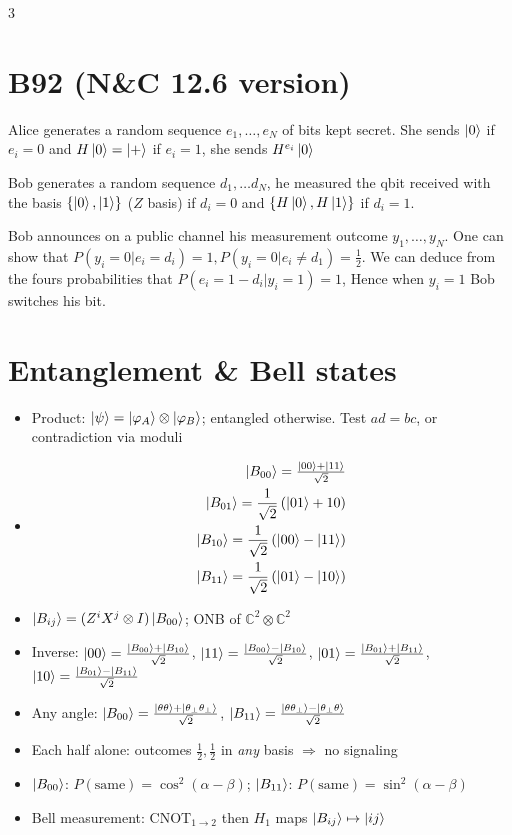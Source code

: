 \documentclass[10pt]{article}
\newcommand{\B}[1]{\ket{B_{#1}}}
\begin{document}
\begin{multicols*}{3}
\section{B92 (N\&C 12.6 version)}
Alice generates a random sequence $e_1, \ldots, e_N$ of bits kept secret. She sends $\ket{0}$ if $e_i = 0$ and $H\ket{0} = \ket{+}$ if $e_i = 1$, she sends $H^{e_i}\ket{0}$

Bob generates a random sequence $d_1, \ldots d_N$, he measured the qbit received with the basis $\left\{\ket{0}, \ket{1}\right\}$ ($Z$ basis) if $d_i = 0$ and $\left\{H\ket{0}, H\ket{1}\right\}$ if $d_i = 1$.

Bob announces on a public channel his measurement outcome $y_1, \ldots, y_N$. One can show that $P\left(y_i = 0| e_i = d_i\right) = 1, P\left(y_i = 0| e_i \neq d_1\right) = \frac{1}{2}$. We can deduce from the fours probabilities that $P\left(e_i = 1 - d_i| y_i = 1\right) = 1$, Hence when $y_i = 1$ Bob switches his bit.

\section{Entanglement \& Bell states}
\begin{itemize}
  \item Product: $\ket\psi=\ket{\varphi_A}\otimes\ket{\varphi_B}$; entangled otherwise. Test $ad=bc$, or contradiction via moduli
  \item 
  \begin{align*} 
 \ket{B_{00}}=\tfrac{\ket{00}+\ket{11}}{\sqrt2}\\
\ket{B_{01}} = \frac{1}{\sqrt{2}}\left(\ket{01} + 10\right)\\
\ket{B_{10}} = \frac{1}{\sqrt{2}}\left(\ket{00} - \ket{11}\right)\\
\ket{B_{11}} = \frac{1}{\sqrt{2}} \left(\ket{01}-\ket{10}\right)
  \end{align*}
  \item $\B{ij}=(Z^iX^j\otimes I)\B{00}$; ONB of $\mathbb C^2\otimes\mathbb C^2$
  \item Inverse: $\ket{00}=\tfrac{\B{00}+\B{10}}{\sqrt2}$, $\ket{11}=\tfrac{\B{00}-\B{10}}{\sqrt2}$, $\ket{01}=\tfrac{\B{01}+\B{11}}{\sqrt2}$, $\ket{10}=\tfrac{\B{01}-\B{11}}{\sqrt2}$
  \item Any angle: $\B{00}=\tfrac{\ket{\theta\theta}+\ket{\theta_\perp\theta_\perp}}{\sqrt2}$, $\B{11}=\tfrac{\ket{\theta\theta_\perp}-\ket{\theta_\perp\theta}}{\sqrt2}$
  \item Each half alone: outcomes $\tfrac12,\tfrac12$ in \emph{any} basis $\Rightarrow$ no signaling
  \item $\B{00}$: $P(\text{same})=\cos^2(\alpha-\beta)$; $\B{11}$: $P(\text{same})=\sin^2(\alpha-\beta)$
  \item Bell measurement: CNOT$_{1\to2}$ then $H_1$ maps $\B{ij}\mapsto\ket{ij}$
\end{itemize}


\end{multicols*}
\end{document}
